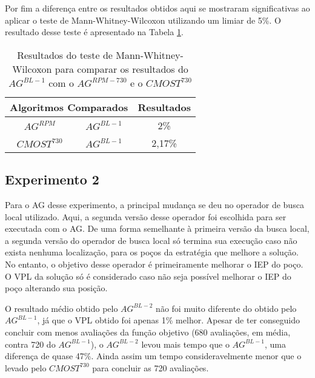 Por fim a diferença entre os resultados obtidos aqui se mostraram significativas ao aplicar o teste de Mann-Whitney-Wilcoxon utilizando um limiar de 5\%. O resultado desse teste é apresentado na Tabela \ref{tab:mw6_2}.

\begin{table}[htb]
\centering
\caption{Resultados do teste de Mann-Whitney-Wilcoxon para comparar os resultados do $AG^{BL-1}$ com o $AG^{RPM-730}$ e o $CMOST^{730}$}
\label{tab:mw6_2}
\begin{tabular}{|c|c|c|}
\hline
\multicolumn{2}{|c|}{Algoritmos Comparados} & Resultados \\ \hline
$AG^{RPM}$  &  $AG^{BL-1}$ & 2\% \\ \hline
$CMOST^{730}$ & $AG^{BL-1}$ & 2,17\% \\ \hline

\end{tabular}
\end{table}

\subsection{Experimento 2}
\label{ch:5_Experimento7}
Para o AG desse experimento, a principal mudança se deu no operador de busca local utilizado. Aqui, a segunda versão desse operador foi escolhida para ser executada com o AG. De uma forma semelhante à primeira versão da busca local, a segunda versão do operador de busca local só termina sua execução caso não exista nenhuma localização, para os poços da estratégia que melhore a solução. No entanto, o objetivo desse operador é primeiramente melhorar o IEP do poço. O VPL da solução só é considerado caso não seja possível melhorar o IEP do poço alterando sua posição.

O resultado médio obtido pelo $AG^{BL-2}$ não foi muito diferente do obtido pelo $AG^{BL-1}$, já que o VPL obtido foi apenas 1\% melhor. Apesar de ter conseguido concluir com menos avaliações da função objetivo (680 avaliações, em média, contra 720 do $AG^{BL-1}$), o $AG^{BL-2}$ levou mais tempo que o $AG^{BL-1}$, uma diferença de quase 47\%. Ainda assim um tempo consideravelmente menor que o levado pelo $CMOST^{730}$ para concluir as 720 avaliações.

